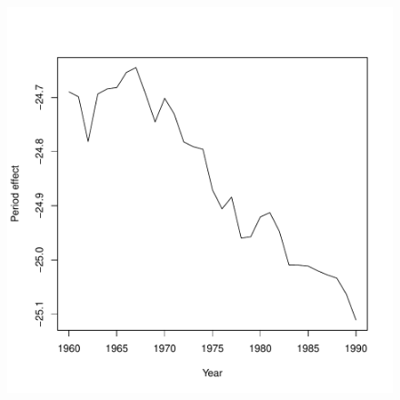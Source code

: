 \documentclass[landscape,letterpaper,9pt]{article}
\begin{document}
\begin{center}
\begin{figure}[h!]
  \centering \leavevmode \includegraphics[angle=0,width=5.2in]{periodeffectr.pdf}
\end{figure}
\end{center}

\clearpage
\newpage
\end{document}
